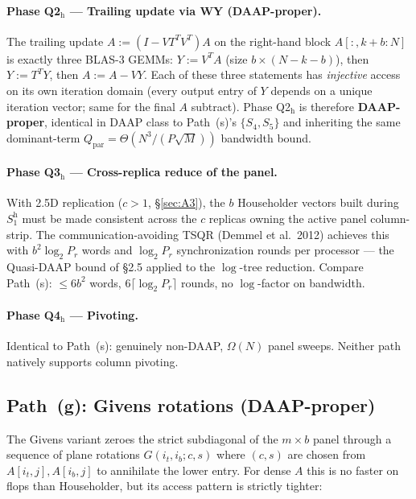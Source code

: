 \documentclass[11pt]{article}
\begin{document}
\paragraph{Phase Q2$_{\mathrm{h}}$ --- Trailing update via WY (DAAP-proper).}
The trailing update $A := (I - V T^T V^T) A$ on the right-hand
block $A[:, k+b:N]$ is exactly three BLAS-3 GEMMs:
$Y := V^T A$ (size $b \times (N{-}k{-}b)$), then
$Y := T^T Y$, then $A := A - V Y$. Each of these three statements has
\emph{injective} access on its own iteration domain (every output
entry of $Y$ depends on a unique iteration vector; same for the final
$A$ subtract). Phase Q2$_{\mathrm{h}}$ is therefore
\textbf{DAAP-proper}, identical in DAAP class to Path~(s)'s
$\{S_4, S_5\}$ and inheriting the same dominant-term
$Q_{\text{par}} = \Theta(N^3/(P\sqrt{M}))$ bandwidth bound.

\paragraph{Phase Q3$_{\mathrm{h}}$ --- Cross-replica reduce of the panel.}
With 2.5D replication ($c > 1$, \S\ref{sec:A3}), the $b$ Householder
vectors built during $S_1^{\mathrm{h}}$ must be made consistent across
the $c$ replicas owning the active panel column-strip. The
communication-avoiding TSQR (Demmel et al.\ 2012) achieves this with
$b^2 \log_2 P_r$ words and $\log_2 P_r$ synchronization rounds per
processor --- the Quasi-DAAP bound of \S2.5 applied to the
$\log$-tree reduction. Compare Path~(s): $\le 6 b^2$ words,
$6 \lceil \log_2 P_r \rceil$ rounds, no $\log$-factor on bandwidth.

\paragraph{Phase Q4$_{\mathrm{h}}$ --- Pivoting.}
Identical to Path~(s): genuinely non-DAAP, $\Omega(N)$ panel sweeps.
Neither path natively supports column pivoting.

\subsection*{Path~(g): Givens rotations (DAAP-proper)}
\label{sec:A1-DAAP-givens}

The Givens variant zeroes the strict subdiagonal of the $m\times b$ panel
through a sequence of plane rotations $G(i_t, i_b; c, s)$ where
$(c, s)$ are chosen from $A[i_t, j], A[i_b, j]$ to annihilate the lower
entry.  For dense $A$ this is no faster on flops than Householder, but
its access pattern is strictly tighter:
\end{document}
